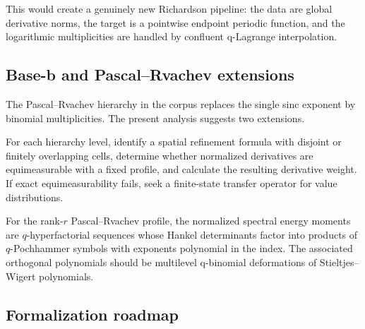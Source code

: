 \documentclass[11pt,oneside]{article}
\theoremstyle{definition}
\theoremstyle{remark}
\begin{document}
This would create a genuinely new Richardson pipeline: the data are global derivative norms,
the target is a pointwise endpoint periodic function, and the logarithmic multiplicities are
handled by confluent q-Lagrange interpolation.

\subsection{Base-b and Pascal--Rvachev extensions}

The Pascal--Rvachev hierarchy in the corpus replaces the single sinc exponent by binomial
multiplicities.  The present analysis suggests two extensions.

\begin{problem}
For each hierarchy level, identify a spatial refinement formula with disjoint or finitely
overlapping cells, determine whether normalized derivatives are equimeasurable with a fixed
profile, and calculate the resulting derivative weight.  If exact equimeasurability fails,
seek a finite-state transfer operator for value distributions.
\end{problem}

\begin{conjecture}
For the rank-$r$ Pascal--Rvachev profile, the normalized spectral energy moments are
$q$-hyperfactorial sequences whose Hankel determinants factor into products of
$q$-Pochhammer symbols with exponents polynomial in the index.  The associated orthogonal
polynomials should be multilevel q-binomial deformations of Stieltjes--Wigert polynomials.
\end{conjecture}

\subsection{Formalization roadmap}
\end{document}
